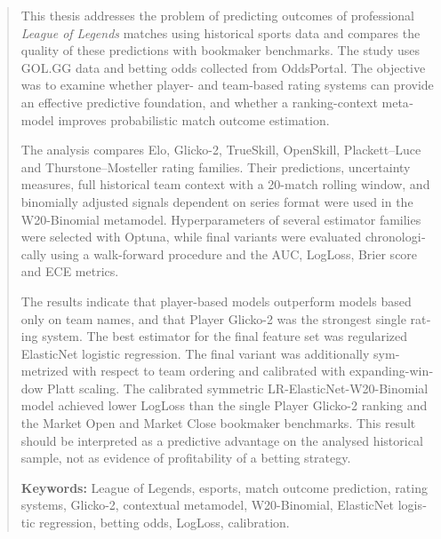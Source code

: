 \documentclass[12pt,a4paper]{report}
\begin{document}
\begin{otherlanguage}{english}
\begin{abstract}
\hspace*{1.5em}This thesis addresses the problem of predicting outcomes of professional
\textit{League of Legends} matches using historical sports data and compares the quality of these
predictions with bookmaker benchmarks. The study uses GOL.GG data and betting odds collected from
OddsPortal. The objective was to examine whether player- and team-based rating systems can provide
an effective predictive foundation, and whether a ranking-context metamodel improves probabilistic
match outcome estimation.

The analysis compares Elo, Glicko-2, TrueSkill, OpenSkill, Plackett--Luce and Thurstone--Mosteller
rating families. Their predictions, uncertainty measures, full historical team context with a
20-match rolling window, and binomially adjusted signals dependent on series format were used in the
W20-Binomial metamodel. Hyperparameters of several estimator families were selected with Optuna,
while final variants were evaluated chronologically using a walk-forward procedure and the AUC,
LogLoss, Brier score and ECE metrics.

The results indicate that player-based models outperform models based only on team names, and that
Player Glicko-2 was the strongest single rating system. The best estimator for the final feature set
was regularized ElasticNet logistic regression. The final variant was additionally symmetrized with
respect to team ordering and calibrated with expanding-window Platt scaling. The calibrated
symmetric LR-ElasticNet-W20-Binomial model achieved lower LogLoss than the single Player Glicko-2
ranking and the Market Open and Market Close bookmaker benchmarks. This result should be interpreted
as a predictive advantage on the analysed historical sample, not as evidence of profitability of a
betting strategy.

\textbf{Keywords:} League of Legends, esports, match outcome prediction, rating systems,
Glicko-2, contextual metamodel, W20-Binomial, ElasticNet logistic regression, betting odds,
LogLoss, calibration.
\end{abstract}
\end{otherlanguage}

\clearpage

\tableofcontents

\clearpage
{}













\printbibliography

\listoffigures
\listoftables
\end{document}
